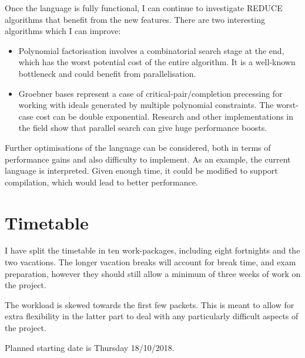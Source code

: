 \documentclass[12pt,a4paper,twoside]{article}
\begin{document}
Once the language is fully functional, I can continue to investigate REDUCE
algorithms that benefit from the new features. There are two interesting
algorithms which I can improve:

\begin{itemize}
  \item Polynomial factorisation involves a combinatorial search stage at the
    end, which has the worst potential cost of the entire algorithm. It is a
    well-known bottleneck and could benefit from parallelisation.
  \item Groebner bases represent a case of critical-pair/completion precessing
    for working with ideals generated by multiple polynomial constraints.
    The worst-case cost can be double exponential. Research and other
    implementations in the field show that parallel search can give huge
    performance boosts.

\end{itemize}

Further optimisations of the language can be considered, both in terms of
performance gains and also difficulty to implement.
As an example, the current language is interpreted. Given enough time,
it could be modified to support compilation, which would lead to better performance.

\section*{Timetable}

I have split the timetable in ten work-packages, including eight fortnights and the two
vacations. The longer vacation breaks will account for break time, and exam preparation,
however they should still allow a minimum of three weeks of work on the project.

The workload is skewed towards the first few packets. This is meant to allow for extra
flexibility in the latter part to deal with any particularly difficult aspects of the project.

Planned starting date is Thursday 18/10/2018.
\end{document}
